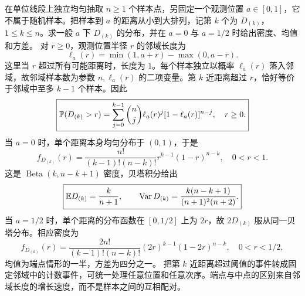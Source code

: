 在单位线段上独立均匀抽取 $n\ge1$ 个样本点，另固定一个观测位置 $a\in[0,1]$，它不属于随机样本。把样本到 $a$ 的距离从小到大排列，记第 $k$ 个为 $D_{(k)}$，$1\le k\le n$。求一般 $a$ 下 $D_{(k)}$ 的分布，并在 $a=0$ 与 $a=1/2$ 时给出密度、均值和方差。
\solution 对 $r\ge0$，观测位置半径 $r$ 的邻域长度为
\[
\ell_a(r)=\min(1,a+r)-\max(0,a-r).
\]
这里当 $r$ 超过所有可能距离时，长度为 $1$。每个样本独立以概率 $\ell_a(r)$ 落入邻域，故邻域样本数为参数 $n,\ell_a(r)$ 的二项变量。第 $k$ 近距离超过 $r$，恰好等价于邻域中至多 $k-1$ 个样本。因此
\[
\boxed{\mathbb{P}(D_{(k)}>r)=\sum_{j=0}^{k-1}\binom nj
\ell_a(r)^j[1-\ell_a(r)]^{n-j},\quad r\ge0.}
\]
当 $a=0$ 时，单个距离本身均匀分布于 $(0,1)$，于是
\[
f_{D_{(k)}}(r)=\frac{n!}{(k-1)!(n-k)!}r^{k-1}(1-r)^{n-k},\quad0<r<1.
\]
这是 $\operatorname{Beta}(k,n-k+1)$ 密度，贝塔积分给出
\[
\boxed{\mathbb{E} D_{(k)}=\frac{k}{n+1},\qquad
\operatorname{Var} D_{(k)}=\frac{k(n-k+1)}{(n+1)^2(n+2)}.}
\]
当 $a=1/2$ 时，单个距离的分布函数在 $[0,1/2]$ 上为 $2r$，故 $2D_{(k)}$ 服从同一贝塔分布。相应密度为
\[
f_{D_{(k)}}(r)=\frac{2n!}{(k-1)!(n-k)!}(2r)^{k-1}(1-2r)^{n-k},\quad0<r<1/2,
\]
均值为端点情形的一半，方差为四分之一。
\insight 把第 $k$ 近距离超过阈值的事件转成固定邻域中的计数事件，可统一处理任意位置和任意次序。端点与中点的区别来自邻域长度的增长速度，而不是样本之间的互相配对。
